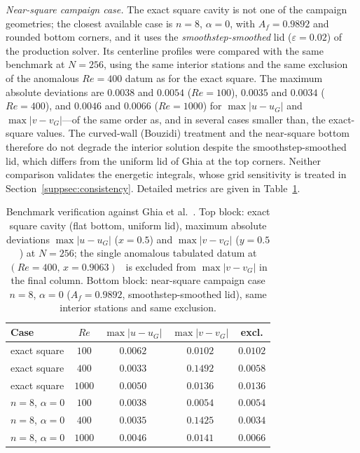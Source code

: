 \emph{Near-square campaign case.} The exact square cavity is not one of the campaign geometries; the closest available case is $n=8$, $\alpha=0$, with $A_f=0.9892$ and rounded bottom corners, and it uses the \emph{smoothstep-smoothed} lid ($\varepsilon=0.02$) of the production solver. Its centerline profiles were compared with the same benchmark at $N=256$, using the same interior stations and the same exclusion of the anomalous $Re=400$ datum as for the exact square. The maximum absolute deviations are $0.0038$ and $0.0054$ ($Re=100$), $0.0035$ and $0.0034$ ($Re=400$), and $0.0046$ and $0.0066$ ($Re=1000$) for $\max|u-u_G|$ and $\max|v-v_G|$---of the same order as, and in several cases smaller than, the exact-square values. The curved-wall (Bouzidi) treatment and the near-square bottom therefore do not degrade the interior solution despite the smoothstep-smoothed lid, which differs from the uniform lid of Ghia at the top corners. Neither comparison validates the energetic integrals, whose grid sensitivity is treated in Section~\ref{suppsec:consistency}. Detailed metrics are given in Table~\ref{supptab:benchmark}.

\begin{table}[!htbp]
\centering
\caption{Benchmark verification against Ghia et al.~\cite{Ghia1982}. Top block: exact square cavity (flat bottom, uniform lid), maximum absolute deviations $\max|u-u_G|$ ($x=0.5$) and $\max|v-v_G|$ ($y=0.5$) at $N=256$; the single anomalous tabulated datum at $(Re{=}400,\,x{=}0.9063)$~\cite{Chai2006} is excluded from $\max|v-v_G|$ in the final column. Bottom block: near-square campaign case $n=8$, $\alpha=0$ ($A_f=0.9892$, smoothstep-smoothed lid), same interior stations and same exclusion.}
\label{supptab:benchmark}
\begin{tabular}{@{}lcccc@{}}
\hline
Case & $Re$ & $\max|u-u_G|$ & $\max|v-v_G|$ & excl. \\
\hline
exact square & $100$  & $0.0062$ & $0.0102$ & $0.0102$ \\
exact square & $400$  & $0.0033$ & $0.1492$ & $0.0058$ \\
exact square & $1000$ & $0.0050$ & $0.0136$ & $0.0136$ \\
\hline
$n=8$, $\alpha=0$ & $100$  & $0.0038$ & $0.0054$ & $0.0054$ \\
$n=8$, $\alpha=0$ & $400$  & $0.0035$ & $0.1425$ & $0.0034$ \\
$n=8$, $\alpha=0$ & $1000$ & $0.0046$ & $0.0141$ & $0.0066$ \\
\hline
\end{tabular}
\end{table}

